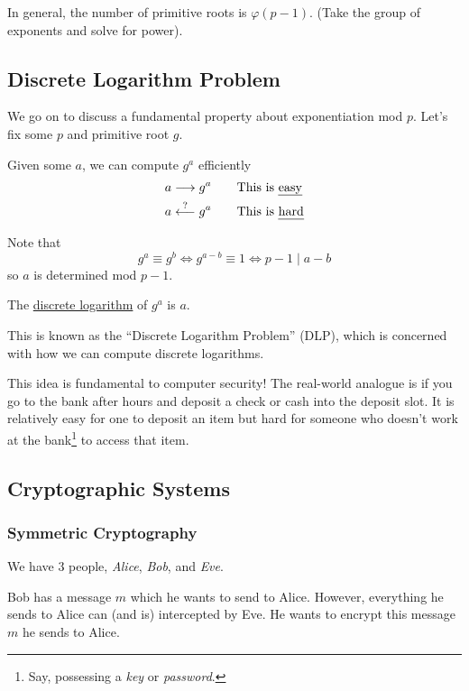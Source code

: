 \begin{remark}
    In general, the number of primitive roots is $\varphi(p-1)$. (Take the group of exponents and solve for power).
\end{remark}

\subsection{Discrete Logarithm Problem}

We go on to discuss a fundamental property about exponentiation mod $p$. Let's fix some $p$ and primitive root $g$.

Given some $a$, we can compute $g^a$ efficiently
\begin{align*}
    a & \longrightarrow g^a \qquad \text{This is \ul{easy}}             \\
    a & \overset{?}{\longleftarrow} g^a \qquad \text{This is \ul{hard}}
\end{align*}

Note that
\[g^a\equiv g^b \Leftrightarrow g^{a-b}\equiv 1 \Leftrightarrow p-1\mid a-b\]
so $a$ is determined mod $p-1$.

\begin{definition}
    The \ul{discrete logarithm} of $g^a$ is $a$.
\end{definition}

This is known as the ``Discrete Logarithm Problem'' (DLP), which is concerned with how we can compute discrete logarithms.

This idea is fundamental to computer security! The real-world analogue is if you go to the bank after hours and deposit a check or cash into the deposit slot. It is relatively easy for one to deposit an item but hard for someone who doesn't work at the bank\footnote{Say, possessing a \emph{key} or \emph{password}.} to access that item.

\subsection{Cryptographic Systems}
\subsubsection{Symmetric Cryptography}
We have $3$ people, \emph{Alice}, \emph{Bob}, and \emph{Eve}.

Bob has a message $m$ which he wants to send to Alice. However, everything he sends to Alice can (and is) intercepted by Eve. He wants to encrypt this message $m$ he sends to Alice.


